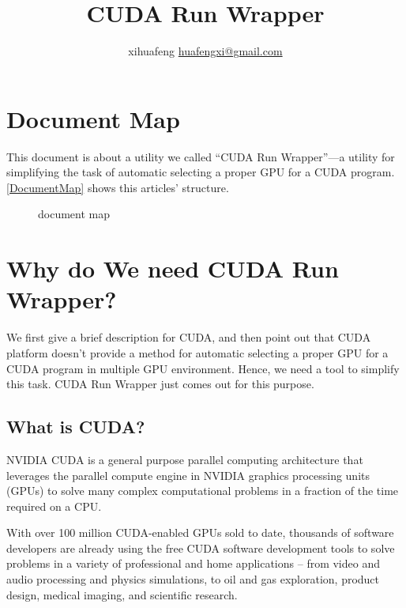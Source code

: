 \documentclass[a4paper,11pt]{article}
\author{xihuafeng \href{mailto:huafengxi@gmail.com}{huafengxi@gmail.com}}
\date{}
\title{CUDA Run Wrapper}
\begin{document}
\pagestyle{fancy} \lhead{}
 \rhead{\thepage}
\cfoot{\today}
\maketitle

\section{Document Map}
This document is about a utility we called ``CUDA Run Wrapper''---a utility for simplifying the task of automatic selecting a proper GPU for a CUDA program. \autoref{DocumentMap} shows this articles' structure.
\begin{figure}[h]
  \centering
{}
  \caption{document map}
  \label{DocumentMap}
\end{figure}

\section{Why do We need CUDA Run Wrapper?}
We first give a brief description for CUDA, and then point out that CUDA platform doesn't provide a method for automatic selecting a proper GPU for a CUDA program in multiple GPU environment. Hence, we need a tool to simplify this task. CUDA Run Wrapper just comes out for this purpose.
\subsection{What is CUDA?}
NVIDIA CUDA is a general purpose parallel computing architecture that leverages the parallel compute engine in NVIDIA graphics processing units (GPUs) to solve many complex computational problems in a fraction of the time required on a CPU.

With over 100 million CUDA-enabled GPUs sold to date, thousands of software developers are already using the free CUDA software development tools to solve problems in a variety of professional and home applications -- from video and audio processing and physics simulations, to oil and gas exploration, product design, medical imaging, and scientific research.
\end{document}
